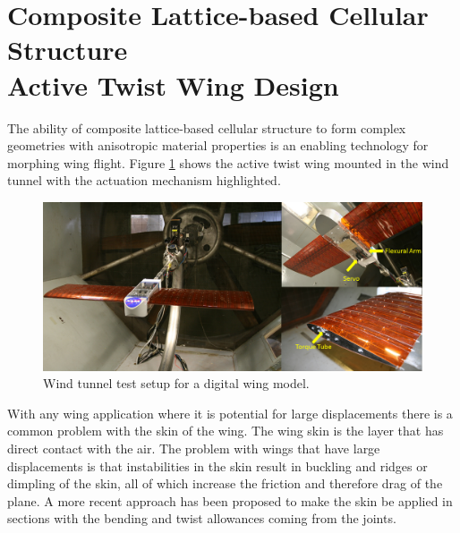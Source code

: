 \documentclass[11pt]{ucthesis}
\begin{document}
\section{Composite Lattice-based Cellular Structure\\Active Twist Wing Design}

The ability of composite lattice-based cellular structure to form complex geometries with anisotropic material properties is an enabling technology for morphing wing flight. Figure \ref{fig:plane} shows the active twist wing mounted in the wind tunnel with the actuation mechanism highlighted.

\begin{figure}[thpb]
\centering
\includegraphics[width=1\linewidth]{./Figures/Plane.png}
\caption{Wind tunnel test setup for a digital wing model.}
\label{fig:plane}
\end{figure}

With any wing application where it is potential for large displacements there is a common problem with the skin of the wing. The wing skin is the layer that has direct contact with the air. The problem with wings that have large displacements is that instabilities in the skin result in buckling and ridges or dimpling of the skin, all of which increase the friction and therefore drag of the plane. A more recent approach has been proposed to make the skin be applied in sections with the bending and twist allowances coming from the joints.
\end{document}
